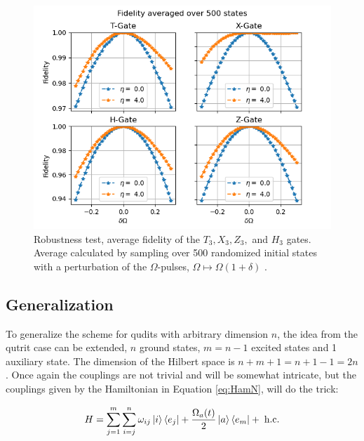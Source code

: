 \begin{figure}[H]
\includegraphics[scale=1]{figures/Fid500.png}

\caption{Robustness test, average fidelity of the $T_3,X_3,Z_3,$ and $H_3$ gates. Average calculated by sampling over 500 randomized initial states with a perturbation of the $\Omega$-pulses, $\Omega \mapsto \Omega(1+\delta)$ .}
\label{fig:fidelity}
\end{figure}

\newpage
\subsection{Generalization}
To generalize the scheme for qudits with arbitrary dimension $n$, the idea from the qutrit case can be extended, $n$ ground states, $m = n - 1$ excited states and 1 auxiliary state. The dimension of the Hilbert space is  $n + m + 1 = n + 1 -1 = 2n$. Once again the couplings are not trivial and will be somewhat intricate, but the couplings given by the Hamiltonian in Equation \ref{eq:HamN}, will do the trick:

\begin{equation}
H = \sum_{j = 1}^m \sum_{i = j}^n \omega_{ij} \ket{i}\bra{e_j} + \frac{\Omega_a(t)}{2}\ket{a}\bra{e_m} +\;\text{h.c}.
\label{eq:HamN}
\end{equation}

